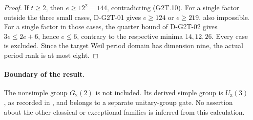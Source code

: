 \begin{proof}
If $t\ge2$, then $e\ge12^2=144$, contradicting (G2T.10).
For a single factor outside the three small cases,
D-G2T-01 gives $e\ge124$ or $e\ge219$, also impossible.
For a single factor in those cases, the quarter bound of
D-G2T-02 gives $3e\le2e+6$, hence $e\le6$, contrary to
the respective minima $14,12,26$.  Every case is excluded.
Since the target Weil period domain has dimension nine,
the actual period rank is at most eight.
\end{proof}

\paragraph{Boundary of the result.}
The nonsimple group $G_2(2)$ is not included.  Its derived
simple group is $U_3(3)$, as recorded in
\cite[Chapter~5, numbered p.~35]{BI:HHM}, and belongs to a
separate unitary-group gate.  No assertion about the other
classical or exceptional families is inferred from this
calculation.
